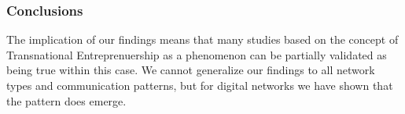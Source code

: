 \subsubsection{Conclusions}
The implication of our findings means that many studies based on the concept of Transnational Entreprenuership as a phenomenon can be partially validated as being true within this case. We cannot generalize our findings to all network types and communication patterns, but for digital networks we have shown that the pattern does emerge.






